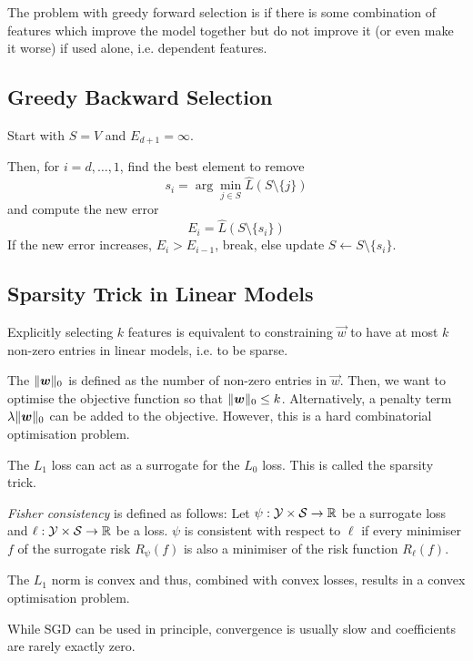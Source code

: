 The problem with greedy forward selection is if there is
some combination of features which improve the model together
but do not improve it (or even make it worse) if used alone,
i.e. dependent features.


\subsection{Greedy Backward Selection}
Start with $S = V$ and $E_{d + 1} = \infty$.

Then, for $i = d, \dotsc, 1$,
find the best element to remove
\begin{equation*}
s_i = \arg\min_{j \in S}{
	\hat{L}(S \setminus \{j\})
}
\end{equation*}
and compute the new error
\begin{equation*}
E_i = \hat{L}(S \setminus \{s_i\})
\end{equation*}
If the new error increases, $E_i > E_{i-1}$,
break, else update $S \gets S \setminus \{s_i\}$.


\subsection{Sparsity Trick in Linear Models}
Explicitly selecting $k$ features is equivalent to constraining
$\vec{w}$ to have at most $k$ non-zero entries in linear models,
i.e. to be sparse.

The $\lVert\boldsymbol{w}\rVert_0$ is defined as the number of non-zero
entries in $\vec{w}$.
Then, we want to optimise the objective function so that
$\lVert\boldsymbol{w}\rVert_0 \leq k$.
Alternatively, a penalty term $\lambda \lVert\boldsymbol{w}\rVert_0$
can be added to the objective.
However, this is a hard combinatorial optimisation problem.

The $L_1$ loss can act as a surrogate for the $L_0$ loss.
This is called the sparsity trick.

\emph{Fisher consistency} is defined as follows:
Let $\psi : \mathcal{Y} \times \mathcal{S} \to \mathbb{R}$
be a surrogate loss and
$\ell : \mathcal{Y} \times \mathcal{S} \to \mathbb{R}$
be a loss.
$\psi$ is consistent with respect to $\ell$
if every minimiser $f$ of the surrogate risk
$R_\psi(f)$ is also a minimiser of the
risk function $R_\ell(f)$.

The $L_1$ norm is convex and thus,
combined with convex losses,
results in a convex optimisation problem.

While SGD can be used in principle,
convergence is usually slow and coefficients
are rarely exactly zero.

